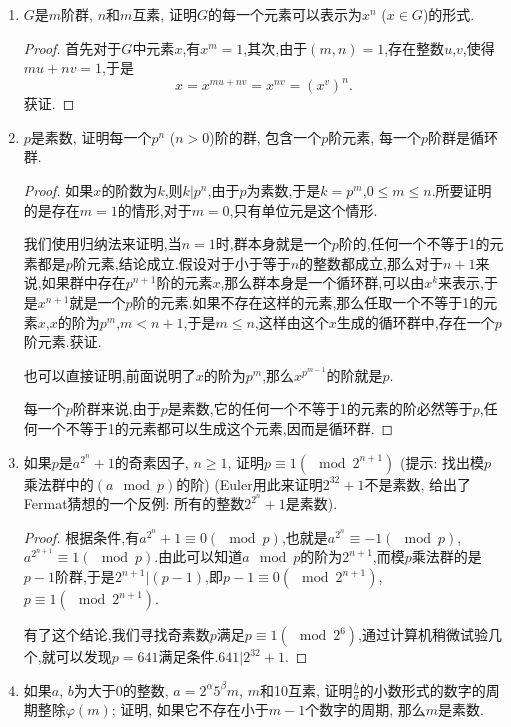 \documentclass[12pt,a4paper]{book} %
\theoremstyle{remark}
\theoremstyle{example}
\theoremstyle{lemma}
\theoremstyle{corollary}
\numberwithin{theorem}{chapter}
\begin{document}
\begin{enumerate}
\item $G$是$m$阶群, $n$和$m$互素, 证明$G$的每一个元素可以表示为$x^n$ ($x \in G$)的形式.

\begin{proof}
首先对于$G$中元素$x$,有$x^m=1$,其次,由于$(m,n)=1$,存在整数$u$,$v$,使得$mu+nv=1$,于是
\[
x = x^{mu+nv}=x^{nv}=(x^v)^n.
\]
获证.
\end{proof}

\item $p$是素数, 证明每一个$p^n$ ($n > 0$)阶的群, 包含一个$p$阶元素, 每一个$p$阶群是循环群.

\begin{proof}
如果$x$的阶数为$k$,则$k|p^n$,由于$p$为素数,于是$k=p^m$,$0 \le m \le n$.所要证明的是存在$m=1$的情形,对于$m=0$,只有单位元是这个情形.

我们使用归纳法来证明,当$n=1$时,群本身就是一个$p$阶的,任何一个不等于1的元素都是$p$阶元素,结论成立.假设对于小于等于$n$的整数都成立,那么对于$n+1$来说,如果群中存在$p^{n+1}$阶的元素$x$,那么群本身是一个循环群,可以由$x^k$来表示,于是$x^{n+1}$就是一个$p$阶的元素.如果不存在这样的元素,那么任取一个不等于1的元素$x$,$x$的阶为$p^m$,$m<n+1$,于是$m \le n$,这样由这个$x$生成的循环群中,存在一个$p$阶元素.获证.

也可以直接证明,前面说明了$x$的阶为$p^m$,那么$x^{p^{m-1}}$的阶就是$p$.

每一个$p$阶群来说,由于$p$是素数,它的任何一个不等于1的元素的阶必然等于$p$,任何一个不等于1的元素都可以生成这个元素,因而是循环群.
\end{proof}

\item 如果$p$是$a^{2^n} + 1$的奇素因子, $n \ge 1$, 证明$p \equiv 1 (\mod 2^{n + 1})$ (提示: 找出模$p$乘法群中的$(a \mod p)$的阶) (Euler用此来证明$2^{32} + 1$不是素数, 给出了Fermat猜想的一个反例: 所有的整数$2^{2^n} + 1$是素数).

\begin{proof}
根据条件,有$a^{2^n} + 1 \equiv 0(\mod{p})$,也就是$a^{2^n} \equiv -1(\mod{p})$,$a^{2^{n+1}} \equiv 1(\mod{p})$.由此可以知道$a \mod {p}$的阶为$2^{n+1}$,而模$p$乘法群的是$p-1$阶群,于是$2^{n+1}|(p-1)$,即$p-1 \equiv 0(\mod{2^{n+1}})$,$p \equiv 1 (\mod 2^{n + 1})$.

有了这个结论,我们寻找奇素数$p$满足$p \equiv 1(\mod{2^6})$,通过计算机稍微试验几个,就可以发现$p=641$满足条件.$641|2^{32}+1$.
\end{proof}

\item 如果$a$, $b$为大于0的整数, $a = 2^{\alpha}5^{\beta}m$, $m$和10互素, 证明$\frac{b}{a}$的小数形式的数字的周期整除$\varphi(m)$; 证明, 如果它不存在小于$m - 1$个数字的周期, 那么$m$是素数.


\end{enumerate}
\end{document}
